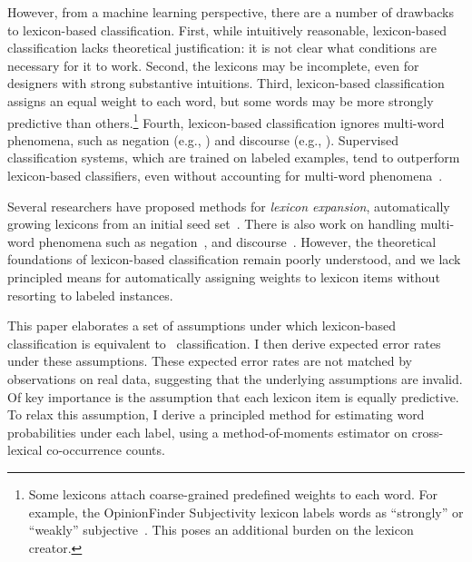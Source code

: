 However, from a machine learning perspective, there are a number of drawbacks to lexicon-based classification. First, while intuitively reasonable, lexicon-based classification lacks theoretical justification: it is not clear what conditions are necessary for it to work. Second, the lexicons may be incomplete, even for designers with strong substantive intuitions. Third, lexicon-based classification assigns an equal weight to each word, but some words may be more strongly predictive than others.\footnote{Some lexicons attach coarse-grained predefined weights to each word. For example, the OpinionFinder Subjectivity lexicon labels words as ``strongly'' or ``weakly'' subjective~\cite{wilson2005recognizing}. This poses an additional burden on the lexicon creator.}
Fourth, lexicon-based classification ignores multi-word phenomena, such as negation (e.g., ) and discourse (e.g., ). Supervised classification systems, which are trained on labeled examples, tend to outperform lexicon-based classifiers, even without accounting for multi-word phenomena~\cite{liu2015sentiment,pang2008opinion}.

Several researchers have proposed methods for \emph{lexicon expansion}, automatically growing lexicons from an initial seed set~\cite{hatzivassiloglou1997predicting,qiu2011opinion}. There is also work on handling multi-word phenomena such as negation~\cite{wilson2005recognizing,polanyi2006contextual}, and discourse~\cite{somasundaran2008discourse,bhatia2015better}. However, the theoretical foundations of lexicon-based classification remain poorly understood, and we lack principled means for automatically assigning weights to lexicon items without resorting to labeled instances. 

This paper elaborates a set of assumptions under which lexicon-based classification is equivalent to \nb\ classification. I then derive expected error rates under these assumptions. These expected error rates are not matched by observations on real data, suggesting that the underlying assumptions are invalid. Of key importance is the assumption that each lexicon item is equally predictive. To relax this assumption, I derive a principled method for estimating word probabilities under each label, using a method-of-moments estimator on cross-lexical co-occurrence counts. 

